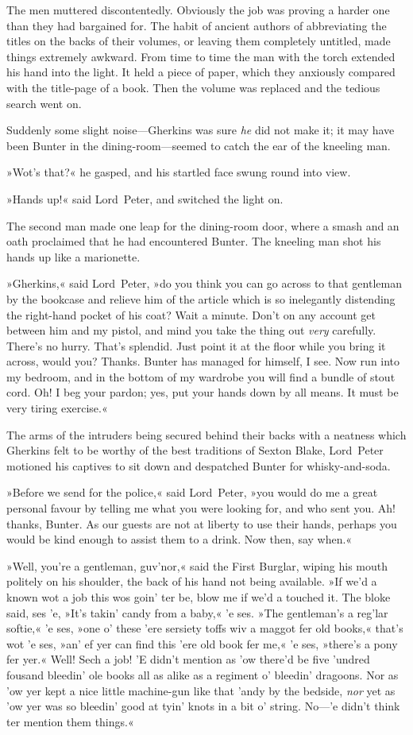 The men muttered discontentedly. Obviously the job was proving a harder one than they had bargained for. The habit of ancient authors of abbreviating the titles on the backs of their volumes, or leaving them completely untitled, made things extremely awkward. From time to time the man with the torch extended his hand into the light. It held a piece of paper, which they anxiously compared with the title-page of a book. Then the volume was replaced and the tedious search went on.

Suddenly some slight noise—Gherkins was sure \textit{he} did not make it; it may have been Bunter in the dining-room—seemed to catch the ear of the kneeling man.

»Wot's that?« he gasped, and his startled face swung round into view.

»Hands up!« said Lord~Peter, and switched the light on.

The second man made one leap for the dining-room door, where a smash and an oath proclaimed that he had encountered Bunter. The kneeling man shot his hands up like a marionette.

»Gherkins,« said Lord~Peter, »do you think you can go across to that gentleman by the bookcase and relieve him of the article which is so inelegantly distending the right-hand pocket of his coat? Wait a minute. Don't on any account get between him and my pistol, and mind you take the thing out \textit{very} carefully. There's no hurry. That's splendid. Just point it at the floor while you bring it across, would you? Thanks. Bunter has managed for himself, I see. Now run into my bedroom, and in the bottom of my wardrobe you will find a bundle of stout cord. Oh! I beg your pardon; yes, put your hands down by all means. It must be very tiring exercise.«

The arms of the intruders being secured behind their backs with a neatness which Gherkins felt to be worthy of the best traditions of Sexton Blake, Lord~Peter motioned his captives to sit down and despatched Bunter for whisky-and-soda.

»Before we send for the police,« said Lord~Peter, »you would do me a great personal favour by telling me what you were looking for, and who sent you. Ah! thanks, Bunter. As our guests are not at liberty to use their hands, perhaps you would be kind enough to assist them to a drink. Now then, say when.«

»Well, you're a gentleman, guv'nor,« said the First Burglar, wiping his mouth politely on his shoulder, the back of his hand not being available. »If we'd a known wot a job this wos goin' ter be, blow me if we'd a touched it. The bloke said, ses 'e, »It's takin' candy from a baby,« 'e ses. »The gentleman's a reg'lar softie,« 'e ses, »one o' these 'ere sersiety toffs wiv a maggot fer old books,« that's wot 'e ses, »an' ef yer can find this 'ere old book fer me,« 'e ses, »there's a pony fer yer.« Well! Sech a job! 'E didn't mention as 'ow there'd be five 'undred fousand bleedin' ole books all as alike as a regiment o' bleedin' dragoons. Nor as 'ow yer kept a nice little machine-gun like that 'andy by the bedside, \textit{nor} yet as 'ow yer was so bleedin' good at tyin' knots in a bit o' string. No—'e didn't think ter mention them things.«

